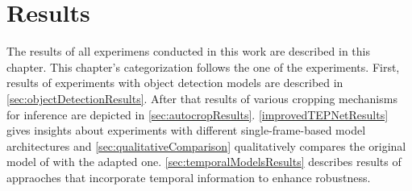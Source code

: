 \chapter{Results}
\label{sec:results}


The results of all experimens conducted in this work are described in this chapter.
This chapter's categorization follows the one of the experiments.
First, results of experiments with object detection models are described in \autoref{sec:objectDetectionResults}.
After that results of various cropping mechanisms for inference are depicted in \autoref{sec:autocropResults}.
\autoref{improvedTEPNetResults} gives insights about experiments with different single-frame-based model architectures and \autoref{sec:qualitativeComparison} qualitatively compares the original model of \cite{tepNet2024} with the adapted one.
\autoref{sec:temporalModelsResults} describes results of appraoches that incorporate temporal information to enhance robustness.












